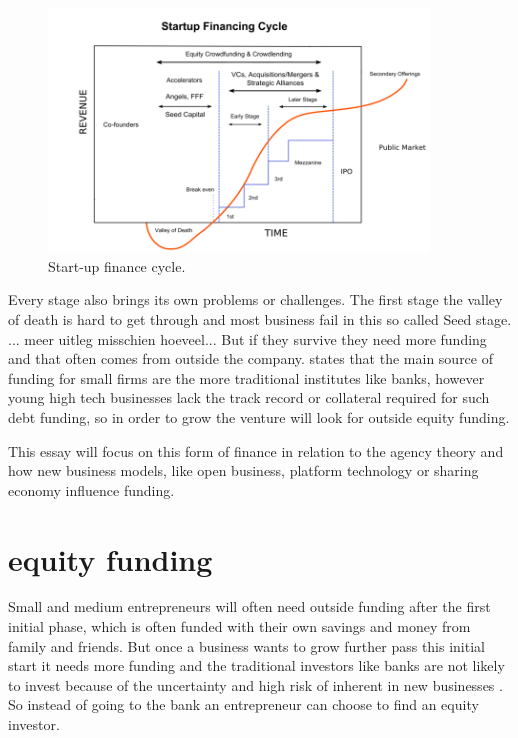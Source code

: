 \documentclass[a4paper, 11pt]{article}
\begin{document}
\begin{figure}[h!]
    \centering
    \includegraphics[width=0.9\textwidth]{FinCycle.png}
    \caption{Start-up finance cycle.}
    \label{fig:graph1}
\end{figure}

Every stage also brings its own problems or challenges. The first stage the valley of death is hard to get through and most business fail in this so called Seed stage.
... meer uitleg misschien hoeveel... But if they survive they need more funding and that often comes from outside the company. \cite{casson2008oxford} states that the main source of funding for small firms are the more traditional institutes like banks, however young high tech businesses lack the track record or collateral required for such debt funding, so in order to grow the venture will look for outside equity funding.

This essay will focus on this form of finance in relation to the agency theory and how new business models, like open business, platform technology or sharing economy influence funding.

\section{equity funding}

Small and medium entrepreneurs will often need outside funding after the first initial phase, which is often funded with their own savings and money from family and friends. But once a business wants to grow further pass this initial start it needs more funding and the traditional investors like banks are not likely to invest because of the uncertainty and high risk of inherent in new businesses \citep{Osnabrugge2000}. So instead of going to the bank an entrepreneur can choose to find an equity investor.
\end{document}
